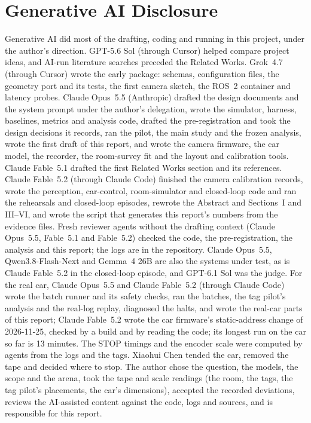 \documentclass[conference]{IEEEtran}
\begin{document}
\section*{Generative AI Disclosure}
Generative AI did most of the drafting, coding and running in this project, under the author's direction.
GPT-5.6 Sol (through Cursor) helped compare project ideas, and AI-run
literature searches preceded the Related Works. Grok~4.7 (through Cursor) wrote the early package: schemas, configuration files, the geometry port and its
tests, the first camera sketch, the ROS~2 container and latency probes. Claude Opus~5.5 (Anthropic) drafted the
design documents and the system prompt under the author's delegation, wrote the simulator, harness,
baselines, metrics and analysis code, drafted the pre-registration and took the design decisions it records,
ran the pilot, the main study and the frozen analysis, wrote the first draft of this report,
and wrote the camera firmware, the car model, the recorder, the room-survey fit and the layout and
calibration tools. Claude
Fable~5.1 drafted the first Related Works section and its references. Claude Fable~5.2 (through Claude Code)
finished the camera calibration records, wrote the perception, car-control, room-simulator and closed-loop
code and ran the rehearsals and closed-loop episodes, rewrote the Abstract and Sections~I and III--VI, and wrote the script that generates
this report's numbers from the evidence files. Fresh reviewer agents without the drafting context (Claude
Opus~5.5, Fable~5.1 and Fable~5.2) checked the code, the pre-registration, the analysis and this report; the
logs are in the repository. Claude Opus~5.5, Qwen3.8-Flash-Next and Gemma~4 26B are also the systems under
test, as is Claude Fable~5.2 in the closed-loop episode, and GPT-6.1 Sol was the judge. For the real car, Claude
Opus~5.5 and Claude Fable~5.2 (through Claude Code) wrote the batch runner and its safety checks, ran the batches,
the tag pilot's analysis and the real-log replay, diagnosed the halts, and wrote the real-car parts of this report;
Claude Fable~5.2 wrote the car firmware's static-address change of 2026-11-25, checked by a build and by reading
the code; its longest run on the car so far is 13 minutes. The STOP timings and the encoder scale were computed by agents from
the logs and the tags. Xiaohui Chen tended the car, removed the tape and decided where to stop. The author chose the
question, the models, the scope and the arena, took the tape and scale readings (the room, the tags, the tag pilot's
placements, the car's dimensions), accepted the recorded deviations, reviews the AI-assisted content against the
code, logs and sources, and is responsible for this report.



\end{document}
